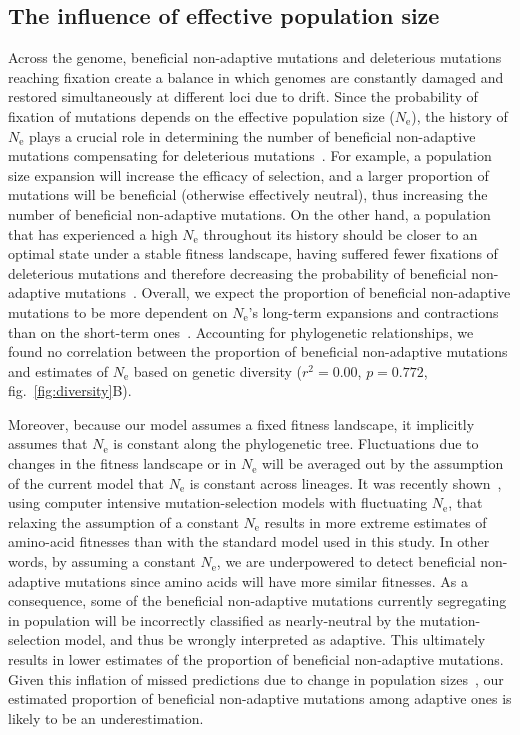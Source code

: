 \documentclass{article}
\newcommand{\Ne}{N_{\text{e}}}
\begin{document}
    \subsection*{The influence of effective population size}

    Across the genome, beneficial non-adaptive mutations and deleterious mutations reaching fixation create a balance in which genomes are constantly damaged and restored simultaneously at different loci due to drift.
    Since the probability of fixation of mutations depends on the effective population size ($\Ne$), the history of $\Ne$ plays a crucial role in determining the number of beneficial non-adaptive mutations compensating for deleterious mutations~\cite{latrille_inferring_2021}.
    For example, a population size expansion will increase the efficacy of selection, and a larger proportion of mutations will be beneficial (otherwise effectively neutral), thus increasing the number of beneficial non-adaptive mutations.
    On the other hand, a population that has experienced a high $\Ne$ throughout its history should be closer to an optimal state under a stable fitness landscape, having suffered fewer fixations of deleterious mutations and therefore decreasing the probability of beneficial non-adaptive mutations~\cite{huber_determining_2017}.
    Overall, we expect the proportion of beneficial non-adaptive mutations to be more dependent on $\Ne$’s long-term expansions and contractions than on the short-term ones~\cite{charlesworth_other_2007,huber_determining_2017}.
    Accounting for phylogenetic relationships, we found no correlation between the proportion of beneficial non-adaptive mutations and estimates of $\Ne$ based on genetic diversity ($r^2=0.00$, $p=0.772$, fig.~\ref{fig:diversity}B).

    Moreover, because our model assumes a fixed fitness landscape, it implicitly assumes that $\Ne$ is constant along the phylogenetic tree.
    Fluctuations due to changes in the fitness landscape or in $\Ne$ will be averaged out by the assumption of the current model that $\Ne$ is constant across lineages.
    It was recently shown~\cite{latrille_inferring_2021}, using computer intensive mutation-selection models with fluctuating $\Ne$, that relaxing the assumption of a constant $\Ne$ results in more extreme estimates of amino-acid fitnesses than with the standard model used in this study.
    In other words, by assuming a constant $\Ne$, we are underpowered to detect beneficial non-adaptive mutations since amino acids will have more similar fitnesses.
    As a consequence, some of the beneficial non-adaptive mutations currently segregating in population will be incorrectly classified as nearly-neutral by the mutation-selection model, and thus be wrongly interpreted as adaptive.
    This ultimately results in lower estimates of the proportion of beneficial non-adaptive mutations.
    Given this inflation of missed predictions due to change in population sizes~\cite{lanfear_population_2014, jones_shifting_2017, platt_protein_2018}, our estimated proportion of beneficial non-adaptive mutations among adaptive ones is likely to be an underestimation.
\end{document}
